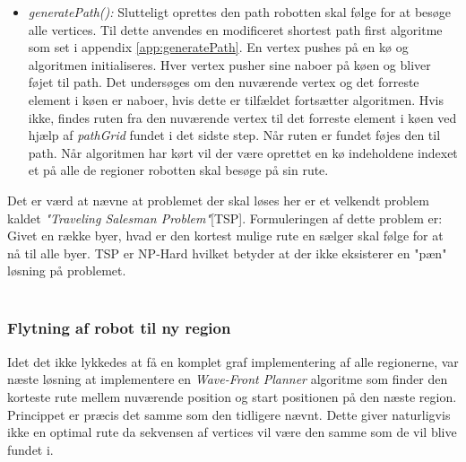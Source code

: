 \begin{itemize}
	 \item \emph{generatePath():} Slutteligt oprettes den path robotten skal følge for at besøge alle vertices. Til dette anvendes en modificeret shortest path first algoritme som set i appendix \ref{app:generatePath}. En vertex pushes på en kø og algoritmen initialiseres. Hver vertex pusher sine naboer på køen og bliver føjet til path. Det undersøges om den nuværende vertex og det forreste element i køen er naboer, hvis dette er tilfældet fortsætter algoritmen. Hvis ikke, findes ruten fra den nuværende vertex til det forreste element i køen ved hjælp af \emph{pathGrid} fundet i det sidste step. Når ruten er fundet føjes den til path. Når algoritmen har kørt vil der være oprettet en kø indeholdene indexet et på alle de regioner robotten skal besøge på sin rute.
\end{itemize}
Det er værd at nævne at problemet der skal løses her er et velkendt problem kaldet \textit{"Traveling Salesman Problem"}[TSP]. Formuleringen af dette problem er: Givet en række byer, hvad er den kortest mulige rute en sælger skal følge for at nå til alle byer. TSP er NP-Hard hvilket betyder at der ikke eksisterer en "pæn" løsning på problemet. \\~\\


\subsubsection{Flytning af robot til ny region}

Idet det ikke lykkedes at få en komplet graf implementering af alle regionerne, var næste løsning at implementere en \emph{Wave-Front Planner} algoritme som finder den korteste rute mellem nuværende position og start positionen på den næste region. Princippet er præcis det samme som den tidligere nævnt.
Dette giver naturligvis ikke en optimal rute da sekvensen af vertices vil være den samme som de vil blive fundet i.


